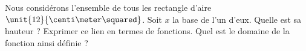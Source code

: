 
\begin{exercice}\label{exoSeconde-0057}

    Nous considérons l'ensemble de tous les rectangle d'aire \( \unit{12}{\centi\meter\squared}\). Soit \( x\) la base de l'un d'eux. Quelle est sa hauteur ? Exprimer ce lien en termes de fonctions. Quel est le domaine de la fonction ainsi définie ?

\end{exercice}
